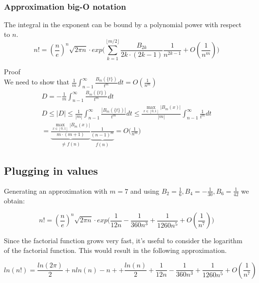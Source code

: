 \documentclass[a4paper]{article}
\begin{document}
    \subsubsection{Approximation big-O notation}

    \begin{theorem}
        The integral in the exponent can be bound by a polynomial power with respect to $n$.
        \begin{equation}
            \boxed{
                n! = (\frac{n}{e})^n \sqrt{2\pi n} \cdot
                exp \Big( \sum_{k=1}^{\lfloor m/2 \rfloor} \frac{B_{2k}}{2k \cdot (2k-1)} \frac{1}{n^{2k-1}} + O(\frac{1}{n^m}) \Big)
            }\label{gf:eq:equation29}
        \end{equation}

        Proof
        \\
        We need to show that $\frac{1}{m} \int_{n-1}^{\infty} \frac{B_m(\{t\})}{t^m}  dt = O \left( \frac{1}{n^m} \right)$
        \begin{gather*}
            D = - \frac{1}{m} \int_{n-1}^{\infty} \frac{B_m(\{t\})}{t^m}  dt
            \\
            D \leq  |D| \leq \frac{1}{|m|} \int_{n-1}^{\infty} \frac{|B_m(\{t\})|}{t^m} dt \leq
            \frac{\max_{x \in [0,1]} |B_m(x)|}{|m|} \int_{n-1}^{\infty} \frac{1}{t^m}  dt
            \\
            =
            \underbrace{\frac{\max_{x \in [0,1]} |B_m(x)|}{m\cdot (m+1)}}_{\neq f(n)}
            \underbrace{\frac{1}{(n-1)^m}}_{f(n)}
            = O \big( \frac{1}{n^m} \big)
        \end{gather*}
    \end{theorem}

    \subsection{Plugging in values}\label{gf:subsec:plugging-in-values}
    Generating an approximation with $m=7$ and using $B_2=\frac{1}{6}, B_4=-\frac{1}{30}, B_6=\frac{1}{42}$ we obtain:

    \begin{equation}
        \label{gf:eq:n_factorial_approx}
        n! = (\frac{n}{e})^n \sqrt{2\pi n} \cdot
        exp \Big( \frac{1}{12 n}
        -
        \frac{1}{360 n^{3}}
        +
        \frac{1}{1260 n^{5}}
        + O(\frac{1}{n^7}) \Big)
    \end{equation}

    Since the factorial function grows very fast, it's useful to consider the logarithm of the factorial function.
    This would result in the following approximation.

    \begin{equation}
        \label{gf:eq:log_n_factorial_approx}
        ln(n!) =
        \frac{ln(2\pi)}{2} +
        n ln(n) - n +
        + \frac{ln(n)}{2}
        + \frac{1}{12 n}
        - \frac{1}{360 n^{3}}
        + \frac{1}{1260 n^{5}}
        + O(\frac{1}{n^7})
    \end{equation}
\end{document}
